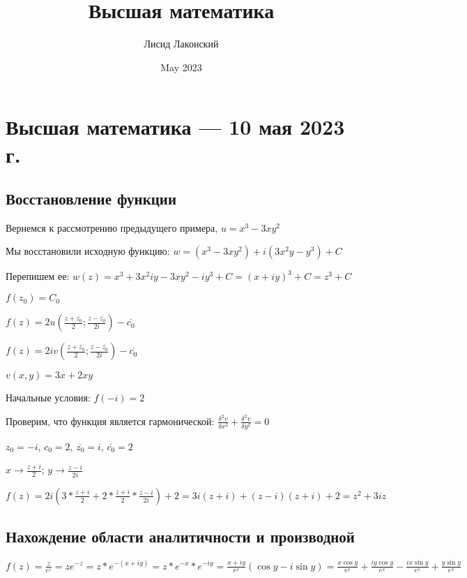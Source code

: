 \documentclass{article}
\title{Высшая математика}
\author{Лисид Лаконский}
\date{May 2023}
\begin{document}
\raggedright

\maketitle

\tableofcontents
\pagebreak

\section{Высшая математика — 10 мая 2023 г.}

\subsection{Восстановление функции}

Вернемся к рассмотрению предыдущего примера, $u = x^3 - 3 x y^2$

Мы восстановили исходную функцию: $w = (x^3 - 3 x y^2) + i (3 x^2 y - y^3) + C$

Перепишем ее: $w (z) = x^3 + 3 x^2 i y - 3 x y^2 - i y^3 + C = (x + i y)^3 + C = z^3 + C$

\hfill

$f(z_0) = C_0$

$f(z) = 2 u (\frac{z + \overline{z_0}}{2} ; \frac{z - \overline{z_0}}{2 i}) - \overline{c_0}$

$f(z) = 2 i v (\frac{z + \overline{z_0}}{2} ; \frac{z - \overline{z_0}}{2 i}) - \overline{c_0}$

\hfill

$v (x, y) = 3 x + 2 x y$

Начальные условия: $f(- i) = 2$

Проверим, что функция является гармонической: $\frac{\delta^2 v}{\delta x^2} + \frac{\delta^2 v}{\delta y^2} = 0$

$z_0 = - i$, $c_0 = 2$, $\overline{z_0} = i$, $\overline{c_0} = 2$

$x \to \frac{z + i}{2}$; $y \to \frac{z - i}{2 i}$

$f(z) = 2 i (3 * \frac{z + i}{2} + 2 * \frac{z + i}{2} * \frac{z - i}{2 i}) + 2 = 3 i (z + i) + (z - i)(z + i) + 2 = z^2 + 3 i z$

\subsection{Нахождение области аналитичности и производной}

$f(z) = \frac{z}{e^{z}} = z e^{-z} = z * e^{- (x + i y)} = z * e^{-x} * e^{-i y} = \frac{x + i y}{e^{x}} (\cos y - i \sin y) = \frac{x \cos y}{e^{x}} + \frac{i y \cos y}{e^{x}} - \frac{i x \sin y}{e^{x}} + \frac{y \sin y}{e^{x}}$
\end{document}
